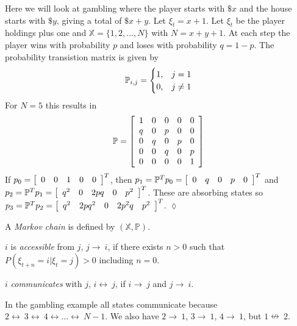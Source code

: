 \begin{example}
Here we will look at gambling where the player starts with $\$x$ and the house starts with $\$y$, giving a total of $\$x+y$.
Let $\xi_t=x+1$.
Let $\xi_t$ be the player holdings plus one and $\mathbb{X}=\{1,2,\ldots,N\}$ with $N=x+y+1$.
At each step the player wins with probability $p$ and loses with probability $q=1-p$.
The probability transistion matrix is given by
$$\mathbb{P}_{i,j} = \begin{cases} 1, & j=1 \\ 0, & j\neq1 \end{cases}$$
For $N=5$ this results in
\begin{align*}
\mathbb{P} = \left[\begin{array}{c c c c c}
1 & 0 & 0 & 0 & 0 \\
q & 0 & p & 0 & 0 \\
0 & q & 0 & p & 0 \\
0 & 0 & q & 0 & p \\
0 & 0 & 0 & 0 & 1
\end{array}\right]
\end{align*}
If $p_0 = \left[\begin{array}{c c c c c} 0 & 0 & 1 & 0 & 0 \end{array}\right]^T$, then $p_1=\mathbb{P}^Tp_0 = \left[\begin{array}{c c c c c} 0 & q & 0 & p & 0 \end{array}\right]^T$ and $p_2=\mathbb{P}^Tp_1=\left[\begin{array}{c c c c c} q^2 & 0 & 2pq & 0 & p^2 \end{array}\right]^T$.
These are absorbing states so $p_3=\mathbb{P}^Tp_2=\left[\begin{array}{c c c c c} q^2 & 2pq^2 & 0 & 2p^2q & p^2 \end{array}\right]^T$.
$\lozenge$
\end{example}

\begin{definition}
A \textit{Markov chain} is defined by $ (\mathbb{X},\mathbb{P})$.
\end{definition}

\begin{definition}
$i$ is \textit{accessible} from $j$, $j\rightarrow~i$, if there exists $n>0$ such that $P (\xi_{t+n}=i|\xi_t=j)>0$ including $n=0$.
\end{definition}

\begin{definition}
$i$ \textit{communicates} with $j$, $i\leftrightarrow~j$, if $i\rightarrow~j$ and $j\rightarrow~i$.
\end{definition}
In the gambling example all states communicate because $2\leftrightarrow~3\leftrightarrow~4\leftrightarrow\ldots\leftrightarrow~N-1$.
We also have $2\rightarrow~1$, $3\rightarrow~1$, $4\rightarrow~1$, but $1\nleftrightarrow~2$.

